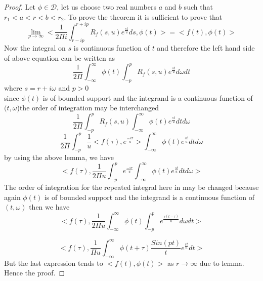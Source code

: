  \begin{proof}
 Let $\phi \in \mathcal{D}$, let us choose two real numbers $a$ and $b$ such that $r_{1}<a<r<b<r_{2}$. To prove the theorem it is sufficient to prove that 
 \begin{equation}
 \underset{p\rightarrow\infty}\lim<\frac{1}{2\Pi i}\int_{r-ip}^{r+ip}R_{f}(s,u)e^{\frac{st}{u}}ds,\phi(t)>=<f(t),\phi(t)>
 \end{equation}
 Now the integral on $s$ is continuous function of $t$ and therefore the left hand side of above equation can be written as
  \begin{equation}
 \frac{1}{2\Pi}\int_{-\infty}^{\infty}\phi(t)\int_{-p}^{p}R_{f}(s,u)e^{\frac{st}{u}}d\omega dt
 \end{equation}
 where $s=r+i\omega $ and $p>0$\\
 since $\phi(t)$ is of bounded support and the integrand is a continuous function of $(t,\omega$)the order of integration may be interchanged
 \begin{equation*}
 \frac{1}{2\Pi}\int_{-p}^{p}R_{f}(s,u)\int_{-\infty}^{\infty}\phi(t)e^{\frac{st}{u}} dt d\omega
 \end{equation*}
 \begin{equation*}
 \frac{1}{2\Pi}\int_{-p}^{p}\frac{1}{u}<f(\tau),e^{\frac{-s\tau}{u}}>\int_{-\infty}^{\infty}\phi(t)e^{\frac{st}{u}} dt d\omega
 \end{equation*}
by using the above lemma, we have
 \begin{equation*}
<f(\tau),\frac{1}{2\Pi u}\int_{-p}^{p}e^{\frac{-s\tau}{u}}\int_{-\infty}^{\infty}\phi(t)e^{\frac{st}{u}} dt d\omega>
 \end{equation*}
The order of integration for the repeated integral here in may be changed because again $\phi(t)$ is of bounded support and the integrand is a continuous function of $(t,\omega)$ then we have
 \begin{equation*}
<f(\tau),\frac{1}{2\Pi u}\int_{-\infty}^{\infty}\phi(t)\int_{-p}^{p}e^{\frac{s(t-\tau)}{u}}d\omega dt>
\end{equation*}
 
\begin{equation*}
<f(\tau),\frac{1}{\Pi u}\int_{-\infty}^{\infty}\phi(t+\tau)\frac{Sin(pt)}{t}e^{\frac{rt}{u}}dt>
 \end{equation*}
 But the last expression tends to $<f(t),\phi(t)>$ as $r\rightarrow \infty$ due to lemma.\\
 Hence the proof.
 \end{proof}
 
